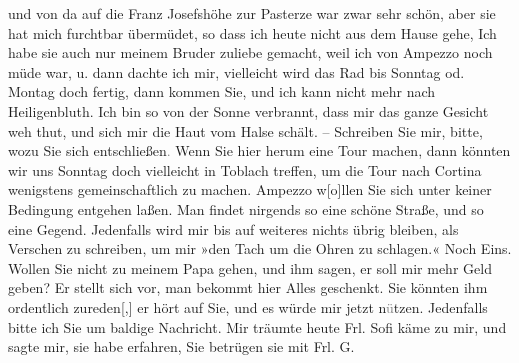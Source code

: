 \begin{ledgroupsized}[t]{13cm}
               und von da auf die Franz
                  Josefshöhe zur Pasterze war zwar sehr schön, aber sie hat mich furchtbar übermüdet, so dass
               ich heute nicht aus dem Hause gehe, Ich habe sie auch nur meinem Bruder zuliebe gemacht, weil ich von Ampezzo noch müde war, u. dann dachte ich mir,
               vielleicht wird das Rad bis Sonntag od. Montag doch
                  fertig, dann kommen Sie, und ich kann nicht mehr nach Heiligenbluth. Ich bin so von der Sonne
               verbrannt, dass mir das ganze Gesicht weh thut, und sich mir die Haut vom Halse
               schält. – \pend
           \pstart
           {\pb}Schreiben Sie mir, bitte, wozu
               Sie sich entschließen\textcolor{gray}{.} Wenn Sie hier herum eine Tour machen, dann
               könnten wir uns Sonntag doch vielleicht in Toblach treffen, um die Tour nach Cortina wenigstens gemeinschaftlich zu machen. \pend
           \pstart
           Ampezzo w{[}o{]}llen Sie sich
               unter keiner Bedingung entgehen laßen. Man findet nirgends so eine schöne Straße, und
               so eine Gegend. \pend
           \pstart
           Jedenfalls wird mir bis auf weiteres nichts übrig bleiben, als Verschen zu schreiben,
               um mir »den Tach um die Ohren zu schlagen.« \pend
           \pstart
           Noch Eins. Wollen Sie nicht zu meinem Papa gehen, und ihm sagen, er soll mir
               mehr Geld geben? Er stellt sich vor, man bekommt hier Alles geschenkt. Sie könnten
               ihm ordentlich zureden{[},{]} er hört auf Sie, und es würde mir jetzt
                  n\textcolor{gray}{ü}tzen. \pend
           \pstart
           Jedenfalls bitte ich Sie um baldige Nachricht. Mir träumte heute Frl. Sofi käme zu mir, und sagte mir, sie
               habe erfahren, Sie betrügen sie mit Frl. G.

\end{ledgroupsized}
